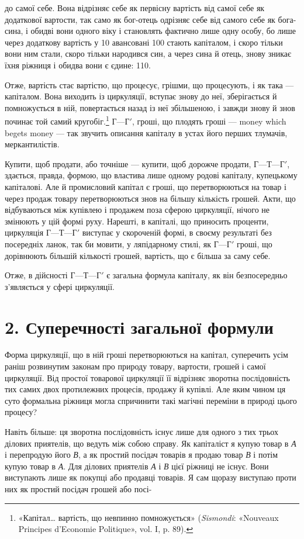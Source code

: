 \parcont{}  %
до самої себе. Вона відрізняє себе як первісну вартість від самої
себе як додаткової вартости, так само як бог-отець одрізняє
себе від самого себе як бога-сина, і обидві вони одного віку
і становлять фактично лише одну особу, бо лише через додаткову
вартість у 10 авансовані 100
стають капіталом, і скоро тільки вони ним стали, скоро тільки
народився син, а через сина й отець, знову зникає їхня ріжниця
і обидва вони є єдине: 110.

Отже, вартість стає вартістю, що процесує, грішми, що процесують,
і як така — капіталом. Вона виходить із циркуляції,
вступає знову до неї, зберігається й помножується в ній, повертається
назад із неї збільшеною, і завжди знову й знов починає той
самий кругобіг.\footnote{
«Капітал\dots{} вартість, що невпинно помножується» (\emph{Sismondi}: «Nouveaux
Principes d’Economie Politique», vol. I, p. 89).
} $Г — Г'$, гроші, що плодять гроші — money which
begets money — так звучить описання капіталу в устах його
перших тлумачів, меркантилістів.

Купити, щоб продати, або точніше — купити, щоб дорожче
продати, $Г — Т — Г'$, здається, правда, формою, що властива
лише одному родові капіталу, купецькому капіталові. Але й
промисловий капітал є гроші, що перетворюються на товар і
через продаж товару перетворюються знов на більшу кількість
грошей. Акти, що відбуваються між купівлею і продажем поза
сферою циркуляції, нічого не змінюють у цій формі руху. Нарешті,
в капіталі, що приносить проценти, циркуляція $Г — Т — Г'$
виступає у скороченій формі, в своєму результаті без посередніх
ланок, так би мовити, у ляпідарному стилі, як $Г — Г'$ гроші, що
дорівнюють більшій кількості грошей, вартість, що є більша за
саму себе.

Отже, в дійсності $Г — Т — Г'$ є загальна формула капіталу,
як він безпосередньо з’являється у сфері циркуляції.

\section*{2. Суперечності загальної формули}

Форма циркуляції, що в ній гроші перетворюються на капітал,
суперечить усім раніш розвинутим законам про природу товару,
вартости, грошей і самої циркуляції. Від простої товарової
циркуляції її відрізняє зворотна послідовність тих самих двох
протилежних процесів, продажу й купівлі. Але яким чином
ця суто формальна ріжниця могла спричинити такі магічні переміни
в природі цього процесу?

Навіть більше: ця зворотна послідовність існує лише для
одного з тих трьох ділових приятелів, що ведуть між собою
справу. Як капіталіст я купую товар в \emph{А} і перепродую його \emph{В},
а як простий посідач товарів я продаю товар \emph{В} і потім купую
товар в \emph{А}. Для ділових приятелів \emph{А} і \emph{В} цієї ріжниці не існує.
Вони виступають лише як покупці або продавці товарів. Я сам
щоразу виступаю проти них як простий посідач грошей або посі-
\parbreak{}  %
